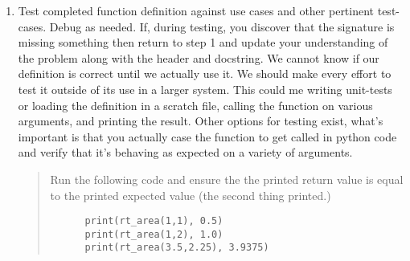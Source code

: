 \documentclass[nobib]{tufte-handout}
\begin{document}
\begin{enumerate}
  \item Test completed function definition against use cases and other pertinent test-cases. Debug as needed. If, during testing, you discover that the signature is missing something then return to step 1 and update your understanding of the problem along with the header and docstring. We cannot know if our definition is correct until we actually use it. We should make every effort to test it outside of its use in a larger system. This could me writing unit-tests or loading the definition in a scratch file, calling the function on various arguments, and printing the result. Other options for testing exist, what's important is that you actually case the function to get called in python code and verify that it's behaving as expected on a variety of arguments. 
  \begin{quote}
    Run the following code and ensure the the printed return value is equal to the printed expected value (the second thing printed.)
    \begin{verbatim}
      print(rt_area(1,1), 0.5)
      print(rt_area(1,2), 1.0)
      print(rt_area(3.5,2.25), 3.9375)
    \end{verbatim}
  \end{quote}

\end{enumerate}
\end{document}

